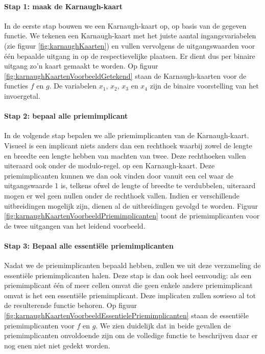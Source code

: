 \paragraph{Stap 1: maak de Karnaugh-kaart}
In de eerste stap bouwen we een Karnaugh-kaart op, op basis van de gegeven functie. We tekenen een Karnaugh-kaart met het juiste aantal ingangsvariabelen (zie figuur \ref{fig:karnaughKaarten}) en vullen vervolgens de uitgangswaarden voor \'e\'en bepaalde uitgang in op de respectievelijke plaatsen. Er dient dus per binaire uitgang zo'n kaart gemaakt te worden. Op figuur \ref{fig:karnaughKaartenVoorbeeldGetekend}
staan de Karnaugh-kaarten voor de functies $f$ en $g$. De variabelen $x_1$, $x_2$, $x_3$ en $x_4$ zijn de binaire voorstelling van het invoergetal.
\paragraph{Stap 2: bepaal alle priemimplicant} In de volgende stap bepalen we alle priemimplicanten van de Karnaugh-kaart. Visueel is een implicant niets anders dan een rechthoek waarbij zowel de lengte en breedte een lengte hebben van machten van twee. Deze rechthoeken vallen uiteraard ook onder de modulo-regel. op een Karnaugh-kaart. Deze priemimplicanten kunnen we dan ook vinden door vanuit een cel waar de uitgangswaarde 1 is, telkens ofwel de lengte of breedte te verdubbelen, uiteraard mogen er wel geen nullen onder de rechthoek vallen. Indien er verschillende uitbreidingen mogelijk zijn, dienen al de uitbreidingen gevolgd te worden. Figuur \ref{fig:karnaughKaartenVoorbeeldPriemimplicanten} toont de priemimplicanten voor de twee uitgangen van het leidend voorbeeld.
\paragraph{Stap 3: Bepaal alle essenti\"ele priemimplicanten} Nadat we de priemimplicanten bepaald hebben, zullen we uit deze verzameling de essenti\"ele priemimplicanten halen. Deze stap is dan ook heel eenvoudig: als een priemimplicant \'e\'en of meer cellen omvat die geen enkele andere priemimplicant omvat is het een essenti\"ele priemimplicant. Deze implicaten zullen sowieso al tot de resulterende functie behoren. Op figuur \ref{fig:karnaughKaartenVoorbeeldEssentielePriemimplicanten} staan de essenti\"ele priemimplicanten voor $f$ en $g$. We zien duidelijk dat in beide gevallen de priemimplicanten onvoldoende zijn om de volledige functie te beschrijven daar er nog enen niet niet gedekt worden.
